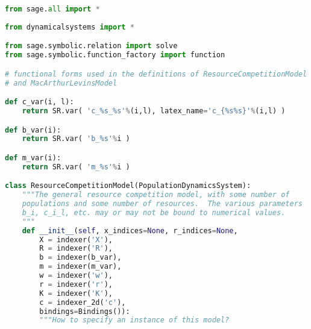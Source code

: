 \begin{lstlisting}[language=Python]
from sage.all import *
 
from dynamicalsystems import *

from sage.symbolic.relation import solve
from sage.symbolic.function_factory import function

# functional forms used in the definitions of ResourceCompetitionModel
# and MacArthurLevinsModel

def c_var(i, l):
    return SR.var( 'c_%s_%s'%(i,l), latex_name='c_{%s%s}'%(i,l) )

def b_var(i):
    return SR.var( 'b_%s'%i )

def m_var(i):
    return SR.var( 'm_%s'%i )

class ResourceCompetitionModel(PopulationDynamicsSystem):
    """The general resource competition model, with some number of
    populations and some number of resources.  The various parameters
    b_i, c_i_l, etc. may or may not be bound to numerical values.
    """
    def __init__(self, x_indices=None, r_indices=None,
        X = indexer('X'),
        R = indexer('R'),
        b = indexer(b_var),
        m = indexer(m_var),
        w = indexer('w'),
        r = indexer('r'),
        K = indexer('K'),
        c = indexer_2d('c'),
        bindings=Bindings()):
        """How to specify an instance of this model?


\end{lstlisting}
